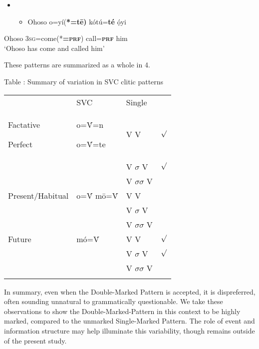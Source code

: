 \begin{itemize}
\item \setcounter{itemize}{0}
\begin{itemize}
\item \gll Ohoso  o=yí(\textbf{*=t\={e})}      kótú=\textbf{té}    ọ́yi\\
\end{itemize}
\end{itemize}
       Ohoso  \textsc{3sg}=come(*\textbf{=}\textbf{\textsc{prf}})  call=\textbf{\textsc{prf  }}  him\\
\glt ‘Ohoso has come and called him’ \citep[285]{Kari2003a}
\z

These patterns are summarized as a whole in 4.

\begin{stylelsTableHeading}
\label{bkm:Ref448139790}Table : Summary of variation in SVC clitic patterns
\end{stylelsTableHeading}

\begin{tabularx}{\textwidth}{XXXX}
\lsptoprule

\multicolumn{2}{X}{} & {\mdseries SVC } & {\mdseries Single}\\
{\mdseries Factative}

{\mdseries Perfect} & {\mdseries o=\'{V}=n}

{\mdseries o=\'{V}=te} & {\mdseries V V} & {\mdseries ${\surd}$}\\
\hhline{--~~} &  & {\mdseries V $\sigma $ V} & {\mdseries ${\surd}$}\\
&  & {\mdseries V $\sigma \sigma $ V} & {\mdseries *}\\
{\mdseries Present/Habitual} & {\mdseries o=\'{V} m\={o}=\'{V}} & {\mdseries V V} & {\mdseries *}\\
&  & {\mdseries V $\sigma $ V} & {\mdseries *}\\
&  & {\mdseries V $\sigma \sigma $ V} & {\mdseries *}\\
{\mdseries Future} & {\mdseries mó=\'{V}} & {\mdseries V V} & {\mdseries ${\surd}$}\\
\hhline{--~~} &  & {\mdseries V $\sigma $ V} & {\mdseries ${\surd}$}\\
&  & {\mdseries V $\sigma \sigma $ V} & {\mdseries *}\\
\hhline{~~--}
\lspbottomrule
\end{tabularx}
In summary, even when the Double-Marked Pattern is accepted, it is dispreferred, often sounding unnatural to grammatically questionable. We take these observations to show the Double-Marked-Pattern in this context to be highly marked, compared to the unmarked Single-Marked Pattern. The role of event and information structure may help illuminate this variability, though remains outside of the present study.

